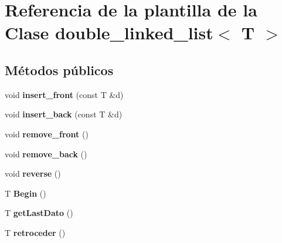 \hypertarget{classdouble__linked__list}{}\section{Referencia de la plantilla de la Clase double\+\_\+linked\+\_\+list$<$ T $>$}
\label{classdouble__linked__list}
\subsection*{Métodos públicos}
\begin{DoxyCompactItemize}
\item 
\mbox{\label{classdouble__linked__list_a4f3ac6d969a61d5627816e32f1431be8}} 
void {\bfseries insert\+\_\+front} (const T \&d)
\item 
\mbox{\label{classdouble__linked__list_ab1bff557b13a3efb9455b58bcb6d7f07}} 
void {\bfseries insert\+\_\+back} (const T \&d)
\item 
\mbox{\label{classdouble__linked__list_a613ff6b3282f2395cbf0cec6f27f0bdf}} 
void {\bfseries remove\+\_\+front} ()
\item 
\mbox{\label{classdouble__linked__list_a260c3143d252a65b2a9349c68bfb7d01}} 
void {\bfseries remove\+\_\+back} ()
\item 
\mbox{\label{classdouble__linked__list_a5fa1033307ab6b7b0d892c005d46ec8c}} 
void {\bfseries reverse} ()
\item 
\mbox{\label{classdouble__linked__list_aa9477a4eb09a8e3330c616799afde4f2}} 
T {\bfseries Begin} ()
\item 
\mbox{\label{classdouble__linked__list_a11ad63ed7ea02ddbe3205c6d6c4e426b}} 
T {\bfseries get\+Last\+Dato} ()
\item 
\mbox{\label{classdouble__linked__list_a9717b04539be395c0e8e129738d5910d}} 
T {\bfseries retroceder} ()
\item 
\mbox{\label{classdouble__linked__list_ab41cc5b1dc2011112a70e5b50874da13}} 

\end{DoxyCompactItemize}
